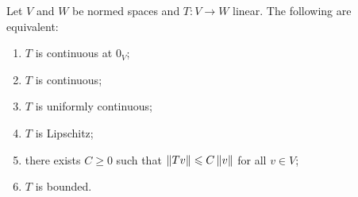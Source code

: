     \begin{proposition}\label{prop:linear-implies-continuous}
        Let $V$ and $W$ be normed spaces and $T:V \rightarrow W$ linear. The following are equivalent:
            \begin{enumerate}[label = (\arabic*),itemsep=1pt,topsep=3pt]
                \item $T$ is continuous at $0_V$;
                \item $T$ is continuous;
                \item $T$ is uniformly continuous;
                \item $T$ is Lipschitz;
                \item there exists $C \geq 0$ such that $\left\lVert Tv \right\rVert \leqslant C \left\lVert v \right\rVert$ for all $v \in V$;
                \item $T$ is bounded.
            \end{enumerate}
    \end{proposition}
